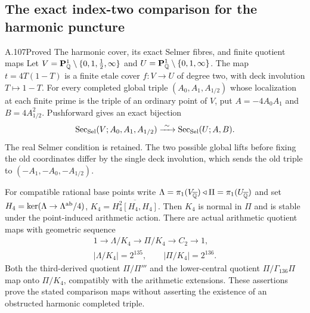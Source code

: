 \subsection{The exact index-two comparison for the harmonic puncture}

\begin{statement}{A.107}{Proved}
{The harmonic cover, its exact Selmer fibres, and finite quotient maps}
Let
$V=\mathbf P^1_\mathbb Q\setminus\{0,1,\tfrac12,\infty\}$ and
$U=\mathbf P^1_\mathbb Q\setminus\{0,1,\infty\}$.
The map $t=4T(1-T)$ is a finite etale cover $f:V\to U$
of degree two, with deck involution $T\mapsto1-T$.
For every completed global triple
$(A_0,A_1,A_{1/2})$ whose localization at each finite
prime is the triple of an ordinary point of $V$, put
$A=-4A_0A_1$ and $B=4A_{1/2}^2$.
Pushforward gives an exact bijection
\[
 \operatorname{Sec}_{\rm Sel}(V;A_0,A_1,A_{1/2})
       \xrightarrow{\ \sim\ }
 \operatorname{Sec}_{\rm Sel}(U;A,B).
\]
The real Selmer condition is retained.
The two possible global lifts before fixing the old
coordinates differ by the single deck involution,
which sends the old triple to
$(-A_1,-A_0,-A_{1/2})$.

For compatible rational base points write
$\Lambda=\pi_1(V_{\overline{\mathbb Q}})\triangleleft
\Pi=\pi_1(U_{\overline{\mathbb Q}})$ and set
$H_4=\ker(\Lambda\to\Lambda^{\rm ab}/4)$,
$K_4=\overline{H_4^2[H_4,H_4]}$.
Then $K_4$ is normal in $\Pi$ and is stable under the
point-induced arithmetic action.  There are actual
arithmetic quotient maps with geometric sequence
\[
 \begin{gathered}
 1\longrightarrow\Lambda/K_4\longrightarrow\Pi/K_4
       \longrightarrow C_2\longrightarrow1,\\
 |\Lambda/K_4|=2^{135},\qquad|\Pi/K_4|=2^{136}.
 \end{gathered}
\]
Both the third-derived quotient $\Pi/\Pi'''$ and
the lower-central quotient $\Pi/\Gamma_{136}\Pi$
map onto $\Pi/K_4$, compatibly with the arithmetic
extensions.  These assertions prove the stated
comparison maps without asserting the existence of
an obstructed harmonic completed triple.
\end{statement}
